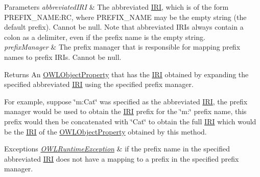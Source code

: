 \begin{DoxyParams}{Parameters}
{\em abbreviated\-I\-R\-I} & The abbreviated \hyperlink{classorg_1_1semanticweb_1_1owlapi_1_1model_1_1_i_r_i}{I\-R\-I}, which is of the form P\-R\-E\-F\-I\-X\-\_\-\-N\-A\-M\-E\-:R\-C, where P\-R\-E\-F\-I\-X\-\_\-\-N\-A\-M\-E may be the empty string (the default prefix). Cannot be null. Note that abbreviated I\-R\-Is always contain a colon as a delimiter, even if the prefix name is the empty string. \\
\hline
{\em prefix\-Manager} & The prefix manager that is responsible for mapping prefix names to prefix I\-R\-Is. Cannot be null. \\
\hline
\end{DoxyParams}
\begin{DoxyReturn}{Returns}
An \hyperlink{interfaceorg_1_1semanticweb_1_1owlapi_1_1model_1_1_o_w_l_object_property}{O\-W\-L\-Object\-Property} that has the \hyperlink{classorg_1_1semanticweb_1_1owlapi_1_1model_1_1_i_r_i}{I\-R\-I} obtained by expanding the specified abbreviated \hyperlink{classorg_1_1semanticweb_1_1owlapi_1_1model_1_1_i_r_i}{I\-R\-I} using the specified prefix manager. 
\end{DoxyReturn}
For example, suppose \char`\"{}m\-:\-Cat\char`\"{} was specified as the abbreviated \hyperlink{classorg_1_1semanticweb_1_1owlapi_1_1model_1_1_i_r_i}{I\-R\-I}, the prefix manager would be used to obtain the \hyperlink{classorg_1_1semanticweb_1_1owlapi_1_1model_1_1_i_r_i}{I\-R\-I} prefix for the \char`\"{}m\-:\char`\"{} prefix name, this prefix would then be concatenated with \char`\"{}\-Cat\char`\"{} to obtain the full \hyperlink{classorg_1_1semanticweb_1_1owlapi_1_1model_1_1_i_r_i}{I\-R\-I} which would be the \hyperlink{classorg_1_1semanticweb_1_1owlapi_1_1model_1_1_i_r_i}{I\-R\-I} of the \hyperlink{interfaceorg_1_1semanticweb_1_1owlapi_1_1model_1_1_o_w_l_object_property}{O\-W\-L\-Object\-Property} obtained by this method. 
\begin{DoxyExceptions}{Exceptions}
{\em \hyperlink{classorg_1_1semanticweb_1_1owlapi_1_1model_1_1_o_w_l_runtime_exception}{O\-W\-L\-Runtime\-Exception}} & if the prefix name in the specified abbreviated \hyperlink{classorg_1_1semanticweb_1_1owlapi_1_1model_1_1_i_r_i}{I\-R\-I} does not have a mapping to a prefix in the specified prefix manager. \\
\hline
\end{DoxyExceptions}
